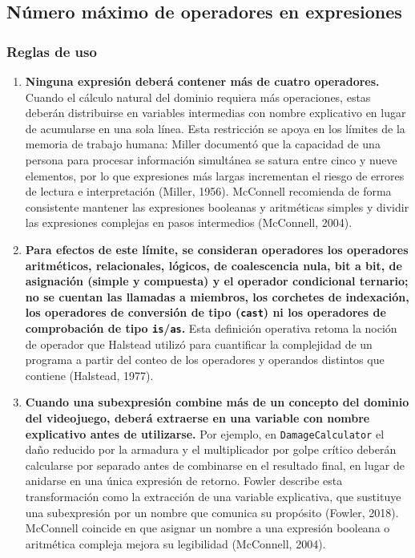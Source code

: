 \subsection{Número máximo de operadores en expresiones}

\subsubsection{Reglas de uso}

\begin{enumerate}
  \item \textbf{Ninguna expresión deberá contener más de cuatro operadores.} Cuando el cálculo natural del dominio requiera más operaciones, estas deberán distribuirse en variables intermedias con nombre explicativo en lugar de acumularse en una sola línea. Esta restricción se apoya en los límites de la memoria de trabajo humana: Miller documentó que la capacidad de una persona para procesar información simultánea se satura entre cinco y nueve elementos, por lo que expresiones más largas incrementan el riesgo de errores de lectura e interpretación (Miller, 1956). McConnell recomienda de forma consistente mantener las expresiones booleanas y aritméticas simples y dividir las expresiones complejas en pasos intermedios (McConnell, 2004).

  \item \textbf{Para efectos de este límite, se consideran operadores los operadores aritméticos, relacionales, lógicos, de coalescencia nula, bit a bit, de asignación (simple y compuesta) y el operador condicional ternario; no se cuentan las llamadas a miembros, los corchetes de indexación, los operadores de conversión de tipo (\texttt{cast}) ni los operadores de comprobación de tipo \texttt{is}/\texttt{as}.} Esta definición operativa retoma la noción de operador que Halstead utilizó para cuantificar la complejidad de un programa a partir del conteo de los operadores y operandos distintos que contiene (Halstead, 1977).

  \item \textbf{Cuando una subexpresión combine más de un concepto del dominio del videojuego, deberá extraerse en una variable con nombre explicativo antes de utilizarse.} Por ejemplo, en \texttt{DamageCalculator} el daño reducido por la armadura y el multiplicador por golpe crítico deberán calcularse por separado antes de combinarse en el resultado final, en lugar de anidarse en una única expresión de retorno. Fowler describe esta transformación como la extracción de una variable explicativa, que sustituye una subexpresión por un nombre que comunica su propósito (Fowler, 2018). McConnell coincide en que asignar un nombre a una expresión booleana o aritmética compleja mejora su legibilidad (McConnell, 2004).


\end{enumerate}

